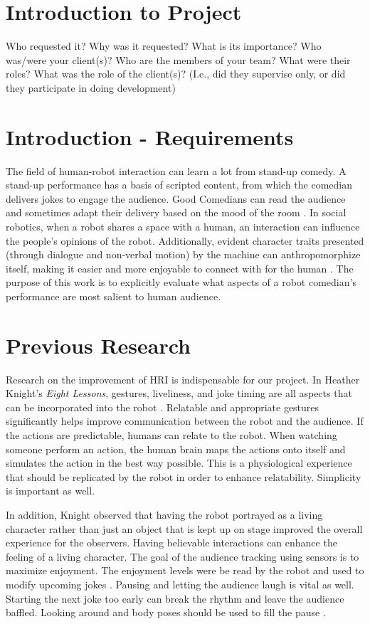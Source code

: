 \documentclass[onecolumn, draftclsnofoot,10pt, compsoc]{IEEEtran}
\begin{document}
\section{Introduction to Project}
Who requested it?
Why was it requested?
What is its importance?
Who was/were your client(s)?
Who are the members of your team?
What were their roles?
What was the role of the client(s)? (I.e., did they supervise only, or did they participate in doing development)

\section{Introduction - Requirements}
The field of human-robot interaction can learn a lot from stand-up comedy. A stand-up performance has a basis of scripted content, from which the comedian delivers jokes to engage the audience. Good Comedians can read the audience and sometimes adapt their delivery based on the mood of the room \cite{talkingFunny}. In social robotics, when a robot shares a space with a human, an interaction can influence the people's opinions of the robot. Additionally, evident character traits presented (through dialogue and non-verbal motion) by the machine can anthropomorphize itself, making it easier and more enjoyable to connect with for the human \cite{KnightEightLessons:2011}. The purpose of this work is to explicitly evaluate what aspects of a robot comedian's performance are most salient to human audience.


\section{Previous Research}

Research on the improvement of HRI is indispensable for our project. In Heather Knight's \textit{Eight Lessons}, gestures, liveliness, and joke timing are all aspects that can be incorporated into the robot {\cite{KnightEightLessons:2011}}.
Relatable and appropriate gestures significantly helps improve communication between the robot and the audience. If the actions are predictable, humans can relate to the robot.
When watching someone perform an action, the human brain maps the actions onto itself and simulates the action in the best way possible. This is a physiological experience that should be replicated by the robot in order to enhance relatability. Simplicity is important as well. {\cite{KnightEightLessons:2011}}

In addition, Knight observed that having the robot portrayed as a living character rather than just an object that is kept up on stage improved the overall experience for the observers. Having believable interactions can enhance the feeling of a living character.
The goal of the audience tracking using sensors is to maximize enjoyment. The enjoyment levels were be read by the robot and used to modify upcoming jokes {\cite{KnightEightLessons:2011}}. Pausing and letting the audience laugh is vital as well. Starting the next joke too early can break the rhythm and leave the audience baffled. Looking around and body poses should be used to fill the pause {\cite{KnightEightLessons:2011}}.
\end{document}
